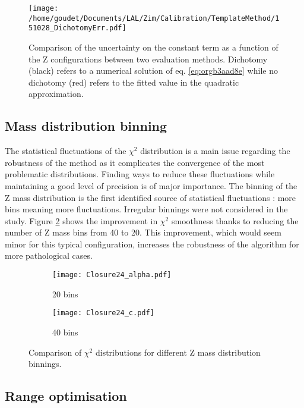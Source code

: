 \begin{figure}[htbp]
\centering
\texttt{[image: /home/goudet/Documents/LAL/Zim/Calibration/TemplateMethod/151028\_DichotomyErr.pdf]}
\caption{\label{fig:orgb6d9fd1}
  Comparison of the uncertainty on the constant term as a function of the Z configurations between two evaluation methods.
  Dichotomy (black) refers to a numerical solution of eq. \ref{eq:orgb3aad8e} while no dichotomy (red) refers to the fitted value in the quadratic approximation.}
\end{figure}


\subsection{Mass distribution binning}
\label{sec:org6eddd66}

The statistical fluctuations of the $\chi^2$ distribution is a main issue regarding the robustness of the method as it complicates the convergence of the most problematic distributions.
Finding ways to reduce these fluctuations while maintaining a good level of precision is of major importance.
The binning of the Z mass distribution is the first identified  source of statistical fluctuations : more bins meaning more fluctuations.
Irregular binnings were not considered in the study.
Figure \ref{org955c893} shows the improvement in $\chi^2$ smoothness thanks to  reducing the number of Z mass bins from 40 to 20.
This improvement, which would seem minor for this typical configuration, increases the robustness of the algorithm for more pathological cases.

\begin{figure}
\begin{subfigure}[t]{0.49\linewidth}
\begin{center}
\texttt{[image: Closure24\_alpha.pdf]}
\end{center}
\caption{20 bins}
\end{subfigure}
\begin{subfigure}[t]{0.49\linewidth}
\begin{center}
\texttt{[image: Closure24\_c.pdf]}
\end{center}
\caption{40 bins}
\end{subfigure}
\caption{\label{org955c893}
Comparison of $\chi^2$ distributions for different Z mass distribution binnings.}
\end{figure}



\subsection{Range optimisation}
\label{sec:org04cf407}
\label{sec:Calibration_inSitu_Tuning_range}


